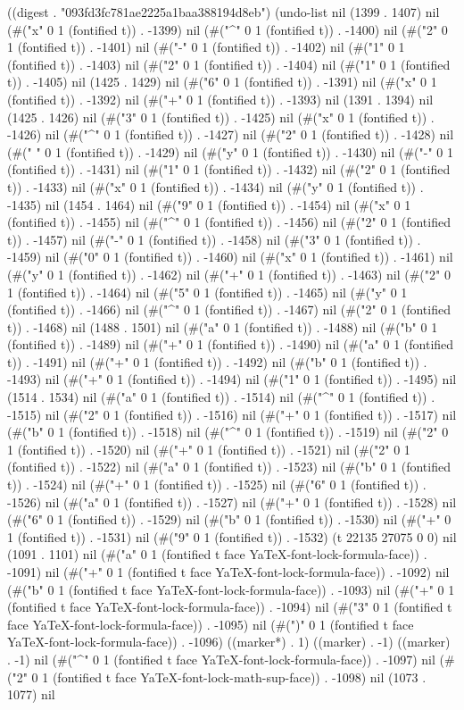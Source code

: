 
((digest . "093fd3fc781ae2225a1baa388194d8eb") (undo-list nil (1399 . 1407) nil (#("x" 0 1 (fontified t)) . -1399) nil (#("^" 0 1 (fontified t)) . -1400) nil (#("2" 0 1 (fontified t)) . -1401) nil (#("-" 0 1 (fontified t)) . -1402) nil (#("1" 0 1 (fontified t)) . -1403) nil (#("2" 0 1 (fontified t)) . -1404) nil (#("1" 0 1 (fontified t)) . -1405) nil (1425 . 1429) nil (#("6" 0 1 (fontified t)) . -1391) nil (#("x" 0 1 (fontified t)) . -1392) nil (#("+" 0 1 (fontified t)) . -1393) nil (1391 . 1394) nil (1425 . 1426) nil (#("3" 0 1 (fontified t)) . -1425) nil (#("x" 0 1 (fontified t)) . -1426) nil (#("^" 0 1 (fontified t)) . -1427) nil (#("2" 0 1 (fontified t)) . -1428) nil (#(" " 0 1 (fontified t)) . -1429) nil (#("y" 0 1 (fontified t)) . -1430) nil (#("-" 0 1 (fontified t)) . -1431) nil (#("1" 0 1 (fontified t)) . -1432) nil (#("2" 0 1 (fontified t)) . -1433) nil (#("x" 0 1 (fontified t)) . -1434) nil (#("y" 0 1 (fontified t)) . -1435) nil (1454 . 1464) nil (#("9" 0 1 (fontified t)) . -1454) nil (#("x" 0 1 (fontified t)) . -1455) nil (#("^" 0 1 (fontified t)) . -1456) nil (#("2" 0 1 (fontified t)) . -1457) nil (#("-" 0 1 (fontified t)) . -1458) nil (#("3" 0 1 (fontified t)) . -1459) nil (#("0" 0 1 (fontified t)) . -1460) nil (#("x" 0 1 (fontified t)) . -1461) nil (#("y" 0 1 (fontified t)) . -1462) nil (#("+" 0 1 (fontified t)) . -1463) nil (#("2" 0 1 (fontified t)) . -1464) nil (#("5" 0 1 (fontified t)) . -1465) nil (#("y" 0 1 (fontified t)) . -1466) nil (#("^" 0 1 (fontified t)) . -1467) nil (#("2" 0 1 (fontified t)) . -1468) nil (1488 . 1501) nil (#("a" 0 1 (fontified t)) . -1488) nil (#("b" 0 1 (fontified t)) . -1489) nil (#("+" 0 1 (fontified t)) . -1490) nil (#("a" 0 1 (fontified t)) . -1491) nil (#("+" 0 1 (fontified t)) . -1492) nil (#("b" 0 1 (fontified t)) . -1493) nil (#("+" 0 1 (fontified t)) . -1494) nil (#("1" 0 1 (fontified t)) . -1495) nil (1514 . 1534) nil (#("a" 0 1 (fontified t)) . -1514) nil (#("^" 0 1 (fontified t)) . -1515) nil (#("2" 0 1 (fontified t)) . -1516) nil (#("+" 0 1 (fontified t)) . -1517) nil (#("b" 0 1 (fontified t)) . -1518) nil (#("^" 0 1 (fontified t)) . -1519) nil (#("2" 0 1 (fontified t)) . -1520) nil (#("+" 0 1 (fontified t)) . -1521) nil (#("2" 0 1 (fontified t)) . -1522) nil (#("a" 0 1 (fontified t)) . -1523) nil (#("b" 0 1 (fontified t)) . -1524) nil (#("+" 0 1 (fontified t)) . -1525) nil (#("6" 0 1 (fontified t)) . -1526) nil (#("a" 0 1 (fontified t)) . -1527) nil (#("+" 0 1 (fontified t)) . -1528) nil (#("6" 0 1 (fontified t)) . -1529) nil (#("b" 0 1 (fontified t)) . -1530) nil (#("+" 0 1 (fontified t)) . -1531) nil (#("9" 0 1 (fontified t)) . -1532) (t 22135 27075 0 0) nil (1091 . 1101) nil (#("a" 0 1 (fontified t face YaTeX-font-lock-formula-face)) . -1091) nil (#("+" 0 1 (fontified t face YaTeX-font-lock-formula-face)) . -1092) nil (#("b" 0 1 (fontified t face YaTeX-font-lock-formula-face)) . -1093) nil (#("+" 0 1 (fontified t face YaTeX-font-lock-formula-face)) . -1094) nil (#("3" 0 1 (fontified t face YaTeX-font-lock-formula-face)) . -1095) nil (#(")" 0 1 (fontified t face YaTeX-font-lock-formula-face)) . -1096) ((marker*) . 1) ((marker) . -1) ((marker) . -1) nil (#("^" 0 1 (fontified t face YaTeX-font-lock-formula-face)) . -1097) nil (#("2" 0 1 (fontified t face YaTeX-font-lock-math-sup-face)) . -1098) nil (1073 . 1077) nil 